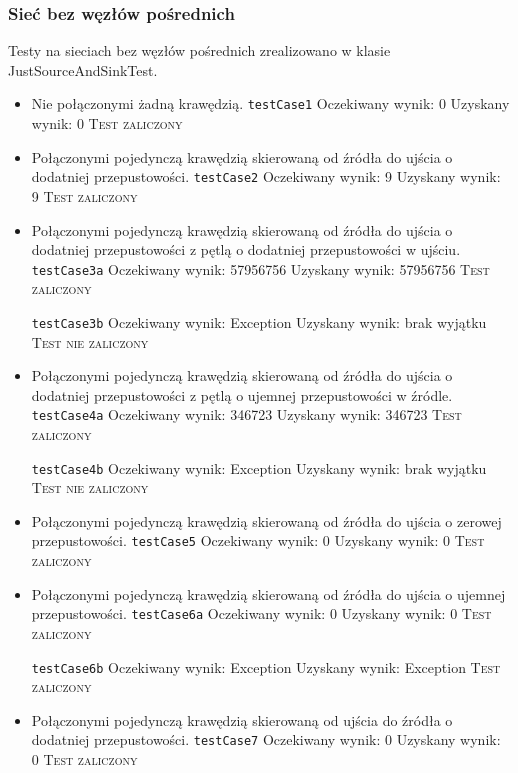 \subsubsection{Sieć bez węzłów pośrednich}
Testy na sieciach bez węzłów pośrednich zrealizowano w klasie JustSourceAndSinkTest.
\begin{itemize}[nosep]
    \item Nie połączonymi żadną krawędzią.
    \texttt{testCase1}
    Oczekiwany wynik: 0
    Uzyskany wynik: 0
    \textsc{Test zaliczony}

    \item Połączonymi pojedynczą krawędzią skierowaną od źródła do ujścia o dodatniej przepustowości.
    \texttt{testCase2}
    Oczekiwany wynik: 9
    Uzyskany wynik: 9
    \textsc{Test zaliczony}

    \item Połączonymi pojedynczą krawędzią skierowaną od źródła do ujścia o dodatniej przepustowości z pętlą o dodatniej przepustowości w ujściu.
    \texttt{testCase3a}
    Oczekiwany wynik: 57956756
    Uzyskany wynik: 57956756
    \textsc{Test zaliczony}

    \texttt{testCase3b}
    Oczekiwany wynik: Exception
    Uzyskany wynik: brak wyjątku
    \textsc{Test nie zaliczony}

    \item Połączonymi pojedynczą krawędzią skierowaną od źródła do ujścia o dodatniej przepustowości z pętlą o ujemnej przepustowości w źródle.
    \texttt{testCase4a}
    Oczekiwany wynik: 346723
    Uzyskany wynik: 346723
    \textsc{Test zaliczony}

    \texttt{testCase4b}
    Oczekiwany wynik: Exception
    Uzyskany wynik: brak wyjątku
    \textsc{Test nie zaliczony}

    \item Połączonymi pojedynczą krawędzią skierowaną od źródła do ujścia o zerowej przepustowości.
    \texttt{testCase5}
    Oczekiwany wynik: 0
    Uzyskany wynik: 0
    \textsc{Test zaliczony}

    \item Połączonymi pojedynczą krawędzią skierowaną od źródła do ujścia o ujemnej przepustowości.
    \texttt{testCase6a}
    Oczekiwany wynik: 0
    Uzyskany wynik: 0
    \textsc{Test zaliczony}

    \texttt{testCase6b}
    Oczekiwany wynik: Exception
    Uzyskany wynik: Exception
    \textsc{Test zaliczony}

    \item Połączonymi pojedynczą krawędzią skierowaną od ujścia do źródła o dodatniej przepustowości.
    \texttt{testCase7}
    Oczekiwany wynik: 0
    Uzyskany wynik: 0
    \textsc{Test zaliczony}


\end{itemize}
